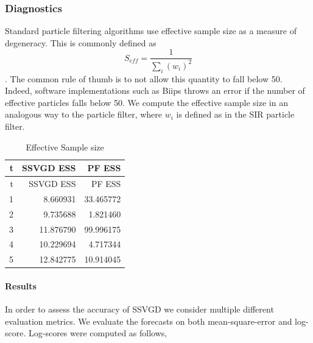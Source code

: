 \documentclass[]{article}
\newenvironment{Shaded}{\begin{snugshade}}{\end{snugshade}}
\newcommand{\KeywordTok}[1]{\textcolor[rgb]{0.13,0.29,0.53}{\textbf{{#1}}}}
\newcommand{\DataTypeTok}[1]{\textcolor[rgb]{0.13,0.29,0.53}{{#1}}}
\newcommand{\DecValTok}[1]{\textcolor[rgb]{0.00,0.00,0.81}{{#1}}}
\newcommand{\StringTok}[1]{\textcolor[rgb]{0.31,0.60,0.02}{{#1}}}
\newcommand{\NormalTok}[1]{{#1}}
\let\oldparagraph\paragraph
\renewcommand{\paragraph}[1]{\oldparagraph{#1}\mbox{}}
\begin{document}
\subsubsection{Diagnostics}\label{diagnostics}

Standard particle filtering algorithms use effective sample size as a
measure of degeneracy. This is commonly defined as
\[S_{eff} = \frac{1}{\sum_i (w_i)^2}\]. The common rule of thumb is to
not allow this quantity to fall below 50. Indeed, software
implementations such as Biips throws an error if the number of effective
particles falls below 50. We compute the effective sample size in an
analogous way to the particle filter, where \(w_i\) is defined as in the
SIR particle filter.

\begin{Shaded}
\end{Shaded}

\begin{longtable}[]{@{}rrr@{}}
\caption{Effective Sample size}\tabularnewline
\toprule
t & SSVGD ESS & PF ESS\tabularnewline
\midrule
\endfirsthead
\toprule
t & SSVGD ESS & PF ESS\tabularnewline
\midrule
\endhead
1 & 8.660931 & 33.465772\tabularnewline
2 & 9.735688 & 1.821460\tabularnewline
3 & 11.876790 & 99.996175\tabularnewline
4 & 10.229694 & 4.717344\tabularnewline
5 & 12.842775 & 10.914045\tabularnewline
\bottomrule
\end{longtable}

\paragraph{Results}\label{results}

In order to assess the accuracy of SSVGD we consider multiple different
evaluation metrics. We evaluate the forecasts on both mean-square-error
and log-score. Log-scores were computed as follows,
\end{document}
